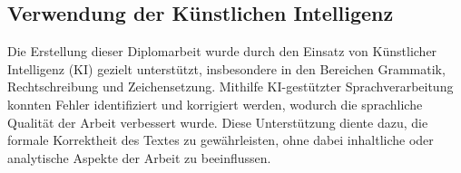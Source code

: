 \subsection*{Verwendung der Künstlichen Intelligenz} 
Die Erstellung dieser Diplomarbeit wurde durch den Einsatz von Künstlicher Intelligenz (KI) gezielt unterstützt, 
insbesondere in den Bereichen Grammatik, Rechtschreibung und Zeichensetzung. Mithilfe KI-gestützter Sprachverarbeitung 
konnten Fehler identifiziert und korrigiert werden, wodurch die sprachliche Qualität der Arbeit verbessert wurde. Diese 
Unterstützung diente dazu, die formale Korrektheit des Textes zu gewährleisten, ohne dabei inhaltliche oder analytische 
Aspekte der Arbeit zu beeinflussen.
